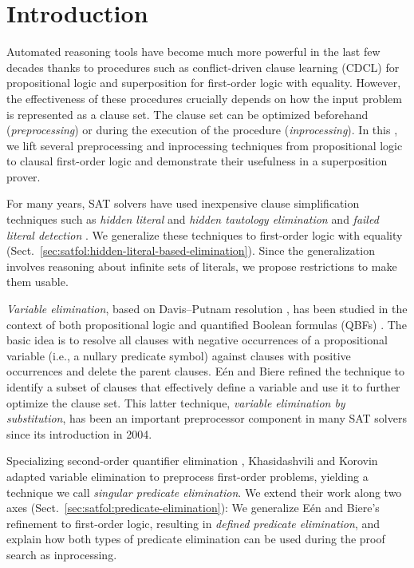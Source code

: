 \section{Introduction}
\label{sec:satfol:introduction}

Automated reasoning tools have become much more powerful in the last few decades
thanks to procedures such as conflict-driven clause learning (CDCL)
\cite{MSLM09HBSAT} for propositional logic and superposition for first-order
logic with equality. However, the effectiveness of these procedures crucially
depends on how the input problem is represented as a clause set. The clause set
can be optimized beforehand (\emph{preprocessing}) or during the execution of
the procedure (\emph{inprocessing}). In this \paper, we lift several
preprocessing and inprocessing techniques from propositional logic to clausal
first-order logic and demonstrate their usefulness in a superposition prover.

For many years, SAT solvers have used inexpensive clause simplification
techniques such as \emph{hidden literal} and \emph{hidden tautology elimination}
\cite{hjb-2010-cl-elim,hjb-2011-big-simplification} and \emph{failed literal
detection} \cite[Sect.~1.6]{jwf-1995-fld}. We generalize these techniques to
first-order logic with equality
(Sect.~\ref{sec:satfol:hidden-literal-based-elimination}). Since the generalization
involves reasoning about infinite sets of literals, we propose restrictions to
make them usable.

\emph{Variable elimination}, based on Davis--Putnam resolution \cite{dp-60-dp}, has
been studied in the context of both propositional logic
\cite{sp-04-niver,cs-00-zres} and quantified Boolean formulas (QBFs)
\cite{ab-2004-re}. The basic idea is to resolve all clauses with negative
occurrences of a propositional variable (i.e., a nullary predicate symbol) against
clauses with positive occurrences and delete the parent clauses. E\'en and
Biere \cite{eb-2005-satpreprocess} refined the technique to identify a subset
of clauses that effectively define a variable and use it to further optimize the
clause set. This latter technique, \emph{variable elimination by substitution},
has been an important preprocessor component in many SAT solvers since its
introduction in 2004.

\begin{sloppypar}
    Specializing second-order quantifier elimination
    \cite{go-1992-so-pred-elim,hjo-1996-scan}, Khasidashvili and Korovin~\cite{kk-2016-pe-fol} adapted variable elimination to preprocess first-order
    problems, yielding a technique we call \emph{singular predicate elimination}. We
    extend their work along two axes (Sect.~\ref{sec:satfol:predicate-elimination}): We
    generalize E\'en and Biere's refinement to first-order logic, resulting in
    \emph{defined predicate elimination}, and explain how both types of predicate
    elimination can be used during the proof search as inprocessing.    
\end{sloppypar}

